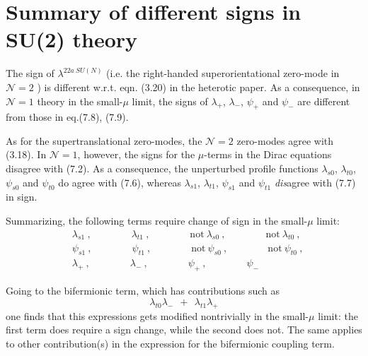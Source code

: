 \documentclass{article}
\newcommand{\mc}[1]{\mathcal{#1}}
\begin{document}
\section{Summary of different signs in SU(2) theory}


The sign of $ \lambda^{22a\ SU(N)} $ (i.e. the right-handed superorientational zero-mode in $\mc{N}=2$ ) is different 
w.r.t. eqn. (3.20) in the heterotic paper.
As a consequence, in $\mc{N}=1 $ theory in the small-$\mu$ limit, the signs of $ \lambda_+ $, $ \lambda_- $, $ \psi_+ $
and $ \psi_- $ are different from those in eq.(7.8), (7.9).

As for the supertranslational zero-modes, the $ \mc{N}=2 $ zero-modes agree with (3.18).
In $ \mc{N}=1 $, however, the signs for the $ \mu $-terms in the Dirac equations disagree with (7.2).
As a consequence, the unperturbed profile functions $ \lambda_{s0} $, $ \lambda_{t0} $, $ \psi_{s0} $ and $ \psi_{t0} $ do agree 
with (7.6), whereas $ \lambda_{s1} $, $ \lambda_{t1} $, $ \psi_{s1} $ and $ \psi_{t1} $ {\it dis}agree with (7.7)
in sign.

Summarizing, the following terms require change of sign in the small-$\mu$ limit:
\begin{align*}
%
	& 	\lambda_{s1}~, \qquad\qquad \lambda_{t1}~,  \qquad\qquad \text{not}~\lambda_{s0}~, \qquad\qquad \text{not}~\lambda_{t0}~, \\
%
	& 	\psi_{s1}~, \qquad\qquad \psi_{t1}~,  \qquad\qquad \text{not}~\psi_{s0}~, \qquad\qquad \text{not}~\psi_{t0}~, \\
%
	&	\lambda_+~, \qquad\qquad \lambda_-~, \qquad\qquad \psi_+~, \qquad\qquad \psi_-
\end{align*}

Going to the bifermionic term, which has contributions such as
\[
	\lambda_{t0} \lambda_- ~~+~~ \lambda_{t1} \lambda_+
\]
one finds that this expressions gets modified nontrivially in the small-$\mu$ limit: the first term does require a sign change, while
the second does not.
The same applies to other contribution(s) in the expression for the bifermionic coupling term.
\end{document}
